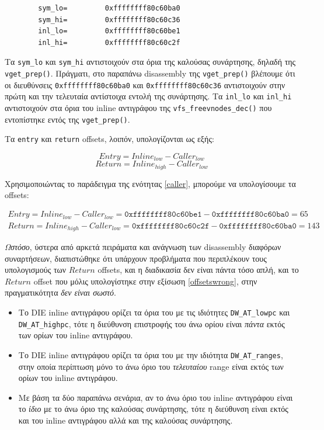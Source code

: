\documentclass[12pt]{article}
\begin{document}
\begin{lstlisting}
        sym_lo=         0xffffffff80c60ba0
        sym_hi=         0xffffffff80c60c36
        inl_lo=         0xffffffff80c60be1
        inl_hi=         0xffffffff80c60c2f
\end{lstlisting}

Τα \lstinline{sym_lo} και \lstinline{sym_hi} αντιστοιχούν στα όρια της καλούσας
συνάρτησης, δηλαδή της \lstinline{vget_prep()}. Πράγματι, στο παραπάνω
disassembly της \lstinline{vget_prep()} βλέπουμε ότι οι διευθύνσεις
\lstinline{0xffffffff80c60ba0} και \lstinline{0xffffffff80c60c36} αντιστοιχούν
στην πρώτη και την τελευταία αντίστοιχα εντολή της συνάρτησης. Τα
\lstinline{inl_lo} και \lstinline{inl_hi} αντιστοιχούν στα όρια του inline
αντιγράφου της \lstinline{vfs_freevnodes_dec()} που εντοπίστηκε εντός της
\lstinline{vget_prep()}.

Τα \lstinline{entry} και \lstinline{return} offsets, λοιπόν, υπολογίζονται ως
εξής:

\[
	Entry = Inline_{low} - Caller_{low}
\]
\[
	Return = Inline_{high} - Caller_{low}
\]

Χρησιμοποιώντας το παράδειγμα της ενότητας \ref{caller}, μπορούμε να
υπολογίσουμε τα offsets:

\begin{equation}
\begin{split}
	Entry = Inline_{low} - Caller_{low} =
	\mathtt{0xffffffff80c60be1} - \mathtt{0xffffffff80c60ba0} = 65 \\
	Return = Inline_{high} - Caller_{low} =
	\mathtt{0xffffffff80c60c2f} - \mathtt{0xffffffff80c60ba0} = 143
\end{split}
\label{offsetswrong}
\end{equation}

\textit{Ωστόσο}, ύστερα από αρκετά πειράματα και ανάγνωση των disassembly
διαφόρων συναρτήσεων, διαπιστώθηκε ότι υπάρχουν προβλήματα που περιπλέκουν τους
υπολογισμούς των $Return$ offsets, και η διαδικασία δεν είναι πάντα τόσο απλή,
και το $Return$ offset που μόλις υπολογίστηκε στην εξίσωση \ref{offsetswrong},
στην πραγματικότητα \textit{δεν είναι σωστό}.

\begin{itemize}
	\item Το DIE inline αντιγράφου ορίζει τα όρια του με τις ιδιότητες
		\lstinline{DW_AT_lowpc} και \lstinline{DW_AT_highpc}, τότε η
		διεύθυνση επιστροφής του άνω ορίου είναι \textit{πάντα} εκτός
		των ορίων του inline αντιγράφου.
	\item Το DIE inline αντιγράφου ορίζει τα όρια του με την ιδιότητα
		\lstinline{DW_AT_ranges}, στην οποία περίπτωση μόνο το άνω όριο
		του \textit{τελευταίου} range είναι εκτός των ορίων του inline
		αντιγράφου.
	\item Με βάση τα δύο παραπάνω σενάρια, αν το άνω όριο του inline
		αντιγράφου είναι το \textit{ίδιο} με το άνω όριο της καλούσας
		συνάρτησης, τότε η διεύθυνση είναι εκτός και του inline
		αντιγράφου αλλά και της καλούσας συνάρτησης.
\end{itemize}
\end{document}
